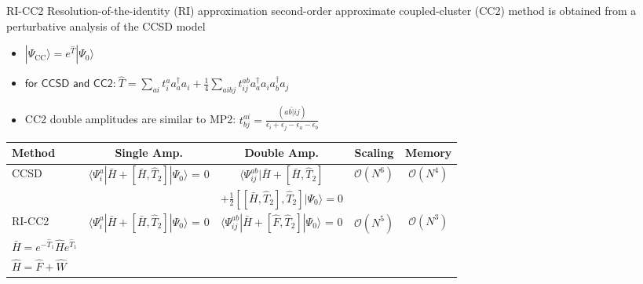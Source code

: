 \documentclass[9pt,t,xcolor=table]{beamer}
\begin{document}
\begin{frame}{\huge RI-CC2}\large
	Resolution-of-the-identity (RI) approximation second-order approximate coupled-cluster (CC2) method is obtained from a perturbative analysis of the CCSD model
	\vspace{4pt}
	\begin{itemize}
		\item $|\Psi_{\mathrm{CC}} \rangle = e^{\hat{T}} | \Psi_0 \rangle$
		\item $\textsf{for CCSD and CC2:} ~
	\hat{T} = \sum_{ai} t^a_i a_a^\dagger a_i + \frac{1}{4}\sum_{aibj} t_{ij}^{ab} a_a^\dagger a_i a_b^\dagger a_j$
		\item CC2 double amplitudes are similar to MP2: $\displaystyle{t^{ai}_{bj} =\frac{(a b \hat{|} i j)}{\epsilon_i + \epsilon_j - \epsilon_a - \epsilon_b}}$
	\end{itemize} 
	\vspace{10pt}
	\begin{table}
		\centering
		\begin{tabular}{lcccc}\toprule
		\textbf{Method} & \textbf{Single Amp.} & \textbf{Double Amp.} & \textbf{Scaling} & \textbf{Memory}\\\midrule
		CCSD & $\langle \Psi^{a}_{i} | \bar{H} + [\bar{H},\hat{T}_2] | \Psi_{0} \rangle$ = 0 & $\langle \Psi^{ab}_{ij} | \bar{H} + [\bar{H},\hat{T}_2] $  & $\mathcal{O}(N^6)$ & $\mathcal{O}(N^{4})$\\
				& & $+ \frac{1}{2}[[\bar{H},\hat{T}_2],\hat{T}_2]| \Psi_{0} \rangle = 0 $ & & \\ 
		RI-CC2 & $\langle \Psi^{a}_{i} | \bar{H} + [\bar{H},\hat{T}_2] | \Psi_{0} \rangle$ = 0 & $\langle \Psi^{ab}_{ij} | \bar{H} + [\hat{F},\hat{T}_2] | \Psi_{0} \rangle$ = 0 & $\mathcal{O}(N^5)$ & $\mathcal{O}(N^{3})$\\\bottomrule
		 \small $\bar{H} = e^{-\hat{T}_1}\hat{H} e^{\hat{T}_1} $\\
		 \small $\hat{H} = \hat{F} + \hat{W}$
		\end{tabular}
	\end{table}
	\vfill
\end{frame}
\end{document}
